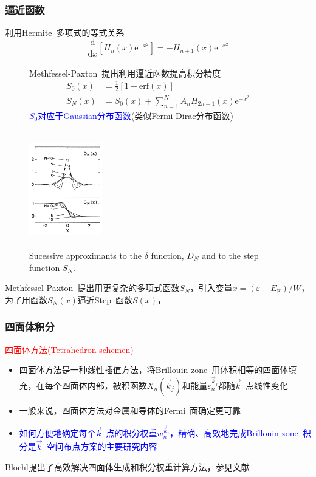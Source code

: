 \documentclass[cjk,slidestop,compress,mathserif,blue]{beamer}
\newcommand{\upcite}[1]{\hspace{0ex}\textsuperscript{\cite{#1}}} %
\begin{document}
\frame
{
	\frametitle{逼近函数}
	利用\textrm{Hermite}~多项式的等式关系$$\frac{\mathrm d}{{\mathrm d}x}[H_n(x)\mathrm{e}^{-x^2}]=-H_{n+1}(x){\mathrm e}^{-x^2}$$
	\begin{figure}[h!]
		\begin{minipage}[t]{0.55\linewidth}
			\textrm{Methfessel-Paxton~}提出利用逼近函数提高积分精度\upcite{PRB40-3616_1989}
		\begin{displaymath}
			\begin{aligned}
				S_0(x)&=\frac12\left[1-\mathrm{erf}(x)\right]\\
				S_N(x)&=S_0(x)+\sum_{n=1}^NA_nH_{2n-1}(x)\mathrm{e}^{-x^2}
			\end{aligned}
		\end{displaymath}
		\textcolor{blue}{$S_0$对应于\textrm{Gaussian}分布函数}(类似\textrm{Fermi-Dirac}分布函数)
		\end{minipage}
		\hfill
		\begin{minipage}[t]{0.40\linewidth}
		\centering
		\vspace*{-0.8in}
		\includegraphics[height=2.0in,width=1.25in,viewport=0 0 530 800,clip]{Figures/MP_SN_DN.png}
		\caption{\textrm{Sucessive approximants to the $\delta$ function, $D_N$ and to the step function $S_N$.}}%
		\label{MP_SN_DN}
		\end{minipage}
	\end{figure} 
	\textrm{Methfessel-Paxton~}提出用更复杂的多项式函数$S_N$，引入变量$x=(\varepsilon-E_{\mathrm F})/W$，为了用函数$S_N(x)$逼近\textrm{Step~}函数$S(x)$，%
}

\frame
{
\frametitle{四面体积分}
	\textcolor{red}{四面体方法\textrm{(Tetrahedron schemen)}}
	\begin{itemize}
		\item 四面体方法是一种线性插值方法，将\textrm{Brillouin-zone~}用体积相等的四面体填充，在每个四面体内部，被积函数$X_n(\vec k_j)$和能量$\varepsilon_n^{\vec k_j}$都随$\vec k$~点线性变化
		\item 一般来说，四面体方法对金属和导体的\textrm{Fermi~}面确定更可靠
		\item \textcolor{blue}{如何方便地确定每个$\vec k$~点的积分权重$w_n^{\vec k_i}$，精确、高效地完成\textrm{Brillouin-zone~}积分是$\vec k$~空间布点方案的主要研究内容}
	\end{itemize}
	\textrm{Bl\"ochl}提出了高效解决四面体生成和积分权重计算方法，参见文献\cite{PRB49-16233_1994}
}
\end{document}
